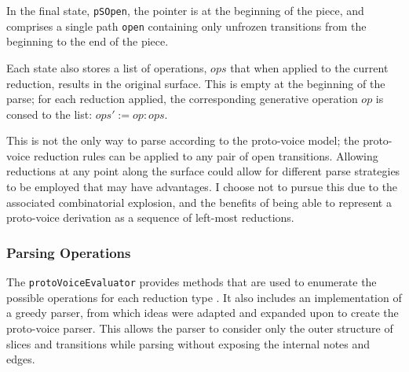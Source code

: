 \documentclass[12pt,a4paper,twoside,openany]{report} \usepackage[pdfborder={0 0 0}]{hyperref}    %
\theoremstyle{definition} \newtheorem{definition}{Definition}[section]
\begin{document}
      In the final state, \texttt{pSOpen}, the pointer is at the beginning of the piece, and comprises a single path
      \texttt{open} containing only unfrozen transitions from the beginning to the end of the piece.

      Each state also stores a list of operations, $ops$ that when applied to the current reduction, results in the
      original surface. This is empty at the beginning of the parse; for each reduction applied, the corresponding
      generative operation $op$ is consed to the list: $ops' := op:ops$. 




      This is not the only way to parse according to the proto-voice model; the proto-voice reduction rules can be applied
      to any pair of open transitions. Allowing reductions at any point along the surface could allow for different
      parse strategies to be employed that may have advantages. I choose not to pursue this due to the associated
      combinatorial explosion, and the benefits of being able to represent a proto-voice derivation as a sequence of
      left-most reductions.

      \subsubsection{Parsing Operations} The \texttt{protoVoiceEvaluator}
      \cite{finkensiepModelingInferringProtovoice2021} provides methods that are used to enumerate the possible
      operations for each reduction type \footnotemark. It also includes an implementation of a greedy parser, from
      which ideas were adapted and expanded upon to create the proto-voice parser. This allows the parser to consider
      only the outer structure of slices and transitions while parsing without exposing the internal notes and edges.
\end{document}
